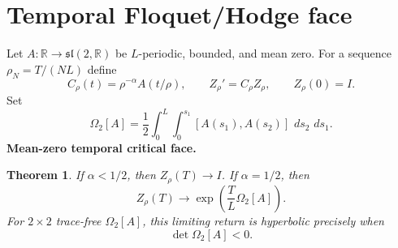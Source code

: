 \documentclass[11pt]{article}
\newtheorem{theorem}{Theorem}[section]
\theoremstyle{definition}\newtheorem{definition}[theorem]{Definition}
\theoremstyle{remark}\newtheorem{remark}[theorem]{Remark}
\newcommand{\R}{\mathbb R}\newcommand{\dd}{\,d}\newcommand{\HH}{\mathcal H}
\begin{document}
\section{Temporal Floquet/Hodge face}
Let $A:\R\to\mathfrak{sl}(2,\R)$ be $L$-periodic, bounded, and mean zero. For a sequence $\rho_N=T/(NL)$ define
\[
C_{\rho}(t)=\rho^{-\alpha}A(t/\rho),\qquad Z_\rho'=C_\rho Z_\rho,\qquad Z_\rho(0)=I.
\]
Set
\[
\Omega_2[A]=\frac12\int_0^L\int_0^{s_1}[A(s_1),A(s_2)]\,\dd s_2\,\dd s_1.
\]
\medskip
\noindent\textbf{Mean-zero temporal critical face.}
\begin{theorem}\label{thm:temporal}
If $\alpha<1/2$, then $Z_\rho(T)\to I$. If $\alpha=1/2$, then
\[
\boxed{Z_\rho(T)\longrightarrow \exp\!\left(\frac{T}{L}\Omega_2[A]\right).}
\]
For $2\times2$ trace-free $\Omega_2[A]$, this limiting return is hyperbolic precisely when
\[
\boxed{\det\Omega_2[A]<0.}
\]
\end{theorem}
\end{document}
